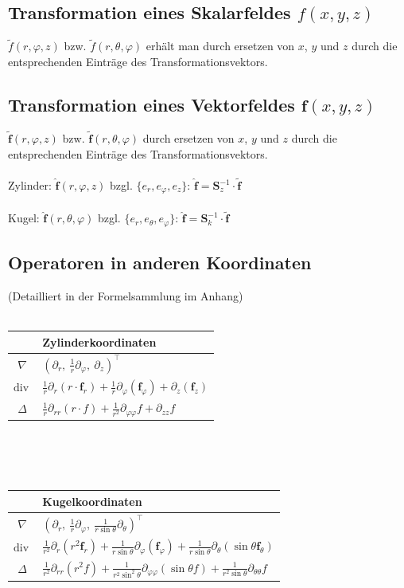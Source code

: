 \documentclass[6pt,a4paper]{scrartcl}
\newcommand{\ma}[1]{\ensuremath{\boldsymbol {#1}}}												%
\renewcommand{\vec}[1]{\ensuremath{\boldsymbol {#1}}}											%
\renewcommand{\div}{\ensuremath{\mathrm{div}\ }}								%
\begin{document}
\begin{multicols*}{4}
\subsection{Transformation eines Skalarfeldes $f(x,y,z)$}
$\tilde{f}(r,\varphi,z)$ bzw.  $\tilde{f}(r,\theta,\varphi)$ erhält man durch ersetzen von $x$, $y$ und $z$ durch die entsprechenden Einträge des Transformationsvektors.


\subsection{Transformation eines Vektorfeldes $\vec f(x,y,z)$ }
$\tilde{\vec f}(r,\varphi,z)$ bzw. $\tilde{\vec f}(r,\theta,\varphi)$ durch ersetzen von $x$, $y$ und $z$ durch die entsprechenden Einträge des Transformationsvektors. \\ \\
Zylinder: $ \hat{\vec f}(r,\varphi,z)$ bzgl. $\{e_r,e_\varphi,e_z\}$: $\hat{\vec f} = \ma S_z^{-1} \cdot \tilde{\vec f}$ \\ \\
Kugel: $\hat{\vec f}(r,\theta,\varphi)$ bzgl. $\{e_r,e_\theta,e_\varphi\}$: $\hat{\vec f} = \ma S_k^{-1} \cdot \tilde{\vec f}$

\subsection{Operatoren in anderen Koordinaten}
(Detailliert in der Formelsammlung im Anhang) \\ \\
\begin{tabular}{c|l} 
 & Zylinderkoordinaten \\ \midrule
 $\nabla$ & $(\partial_r,\ \frac{1}{r}\partial_\varphi,\ \partial_z)^\top$ \\ \midrule
 $\div$ & $\frac{1}{r} \partial_r(r\cdot \vec f_r) + \frac{1}{r} \partial_\varphi(\vec f_\varphi) + \partial_z(\vec f_z)$ \\ \midrule
$ \Delta$ & $\frac{1}{r} \partial_{rr}(r\cdot f) + \frac{1}{r^2} \partial_{\varphi\varphi}f + \partial_{zz}f$
\end{tabular}
\\ \\ \\
\begin{tabular}{c|l} 
 & Kugelkoordinaten \\ \midrule

$\nabla$ & $(\partial_r,\ \frac{1}{r}\partial_\varphi,\ \frac{1}{r\sin\theta}\partial_\theta)^\top$\\ \midrule
$\div$ & $  \frac{1}{r^{2}}  \partial_r(r^2 \vec f_r) + \frac{1}{r \sin \theta} \partial_\varphi(\vec f_\varphi) + \frac{1}{r \sin \theta} \partial_\theta(\sin \theta \vec f_\theta)$\\ \midrule
$\Delta $ & $ \frac{1}{r^{2}} \partial_{rr}(r^2 f) + \frac{1}{r^2\sin^2\theta} \partial_{\varphi\varphi} (\sin\theta f) + \frac{1}{r^2\sin\theta} \partial_{\theta\theta} f$
\end{tabular}


\end{multicols*}
\end{document}
